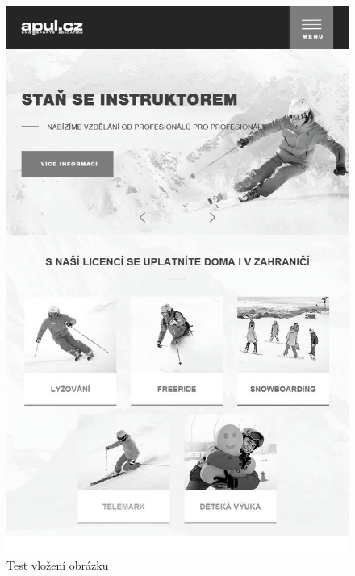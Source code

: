 \documentclass[FM,DP]{tulthesis}
\begin{document}
\begin{figure}[ht]
\centering
\includegraphics[scale=0.15]{images/text/01.jpg}
\caption{Test vložení obrázku}
\label{foto}
\end{figure}








\end{document}
